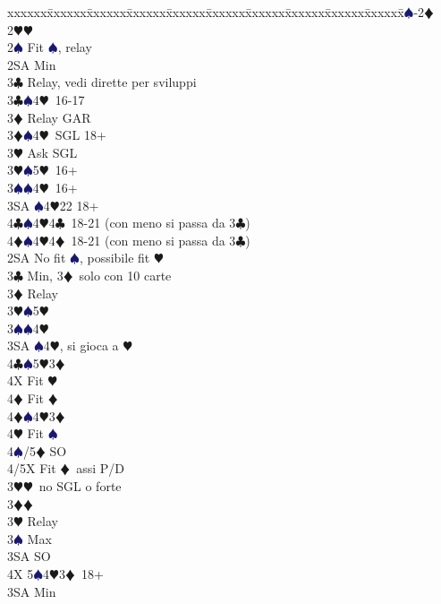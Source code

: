 \documentclass[a4paper,italian]{article}
\newcommand{\BC}{\textcolor{OliveGreen}{$\clubsuit$}}
\newcommand{\BD}{\textcolor{RedOrange}{$\vardiamondsuit$}}
\newcommand{\BH}{\textcolor{Red2}{$\varheartsuit${}}}
\newcommand{\BS}{\textcolor{MidnightBlue}{$\spadesuit${}}}
\newenvironment{bidtable}
{\begin{tabbing}

    xxxxxx\=xxxxxx\=xxxxxx\=xxxxxx\=xxxxxx\=xxxxxx\=xxxxxx\=xxxxxx\=xxxxxx\=xxxxxx\=\kill}
{\end{tabbing} }%
\begin{document}
\begin{multicols}{2}
    \begin{bidtable}
        1\BS-2\BD\\
        2\BH {}\BH \+\\
        2\BS \> Fit \BS , relay\+\\
        2SA \> Min\+\\
        3\BC \> Relay, vedi dirette per sviluppi\-\\
        3\BC {}\BS 4\BH\ 16-17\+\\
        3\BD \> Relay GAR\-\\
        3\BD {}\BS 4\BH\ SGL 18+\+\\
        3\BH \> Ask SGL\-\\
        3\BH {}\BS 5\BH\ 16+\\
        3\BS {}\BS 4\BH\ 16+\\
        3SA \BS 4\BH 22 18+\\
        4\BC {}\BS 4\BH 4\BC\ 18-21 (con meno si passa da 3\BC )\\
        4\BD {}\BS 4\BH 4\BD\ 18-21 (con meno si passa da 3\BC )\-\\
        2SA \> No fit \BS , possibile fit \BH \+\\
        3\BC \> Min, 3\BD\ solo con 10 carte\+\\
        3\BD \> Relay\+\\
        3\BH {}\BS 5\BH \\
        3\BS {}\BS 4\BH \\
        3SA \BS 4\BH , si gioca a \BH \\
        4\BC {}\BS5\BH3\BD \+\\
        4X \> Fit \BH\\
        4\BD \> Fit \BD\-\\
        4\BD {}\BS 4\BH 3\BD\+\\
        4\BH \> Fit \BS\\
        4\BS/5\BD \> SO\\
        4/5X \> Fit \BD\ assi P/D\-\-\\
        3\BH {}\BH\ no SGL o forte\-\\
        3\BD {}\BD \+\\
        3\BH \> Relay\+\\
        3\BS \> Max\+\\
        3SA \> SO\+\\
        4X 5\BS 4\BH 3\BD\ 18+\-\-\\
        3SA \> Min\\

\end{bidtable}
\end{multicols}
\end{document}
